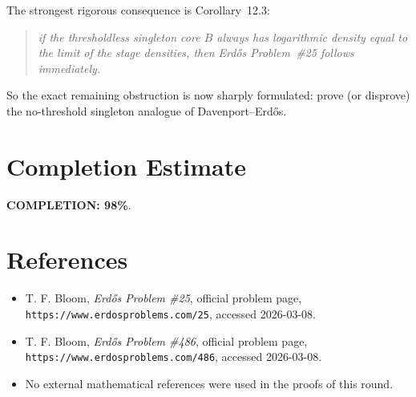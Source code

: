 The strongest rigorous consequence is Corollary~12.3:
\begin{quote}
\emph{if the thresholdless singleton core $B$ always has logarithmic density equal to the limit of the stage densities, then Erd\H{o}s Problem~\#25 follows immediately.}
\end{quote}
So the exact remaining obstruction is now sharply formulated: prove (or disprove) the no-threshold singleton analogue of Davenport--Erd\H{o}s.

\section{Completion Estimate}
\textbf{COMPLETION: 98\%}.

\section{References}
\begin{itemize}
\item T. F. Bloom, \emph{Erd\H{o}s Problem \#25}, official problem page, \texttt{https://www.erdosproblems.com/25}, accessed 2026-03-08.
\item T. F. Bloom, \emph{Erd\H{o}s Problem \#486}, official problem page, \texttt{https://www.erdosproblems.com/486}, accessed 2026-03-08.
\item No external mathematical references were used in the proofs of this round.
\end{itemize}
